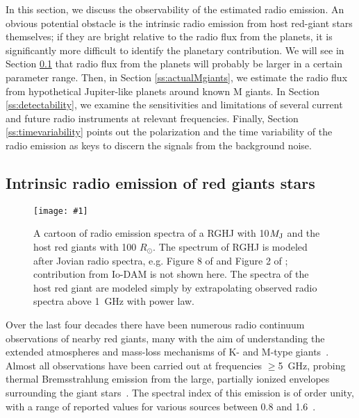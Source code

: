 \documentclass[iop,numberedappendix,apj,twocolappendix,]{emulateapj}
\def\revise#1{\color{blue}{\bf #1} \color{black}}
\def\plotonesc#1{\centering \leavevmode
\texttt{[image: \#1]}}
\def\plotoneh#1{\centering \leavevmode
\texttt{[image: \#1]}}
\begin{document}
In this section, we discuss the observability of the estimated radio emission. 
An obvious potential obstacle is the intrinsic radio emission from host red-giant stars themselves; if they are bright relative to the radio flux from the planets, it is significantly more difficult to identify the planetary contribution.
We will see in Section \ref{ss:RGradio} that radio flux from the planets will probably be larger in a certain parameter range. 
Then, in Section \ref{ss:actualMgiants}, we estimate the radio flux from hypothetical Jupiter-like planets around known M giants. 
In Section \ref{ss:detectability}, we examine the sensitivities and limitations of several current and future
radio instruments at relevant frequencies.
Finally, Section \ref{ss:timevariability} points out the polarization and the time variability of the radio emission as keys to discern the signals from the background noise. 


\subsection{Intrinsic radio emission of red giants stars}
\label{ss:RGradio}


\begin{figure}[tbp]
   \plotoneh{cartoon2_5Mj_100pc_smooth.pdf}
   \caption{A cartoon of radio emission spectra of a RGHJ with 10$M_{\rm J}$ and the host red giants with 100 $R_{\odot }$.
The spectrum of RGHJ is modeled after Jovian radio spectra, e.g. Figure 8 of \citet{zarka_et_al2004} and Figure 2 of \citet{griesmeier2007a}; contribution from Io-DAM is not shown here.
The spectra of the host red giant are modeled simply by extrapolating observed radio spectra above 1~GHz with power law. \revise{The shadowed region represents the frequency below the plasma frequency of the stellar wind.}}
  \label{fig:cartoon}
\end{figure}



Over the last four decades there have been numerous radio continuum observations of nearby red giants, many with the aim of understanding the extended atmospheres and mass-loss mechanisms of K- and M-type giants~\citep[e.g.,][]{Newell1982, Knapp1995, Skinner1997, Lim1998, OGorman2013}.
Almost all observations have been carried out 
at frequencies $\geq$5~GHz, 
probing thermal Bremsstrahlung emission from the large, partially ionized envelopes surrounding the giant stars~\citep{drake1986}.
The spectral index of this emission is of order unity, with a range of reported values for various sources between 0.8 and 1.6~\citep{OGorman2013}.
\end{document}

